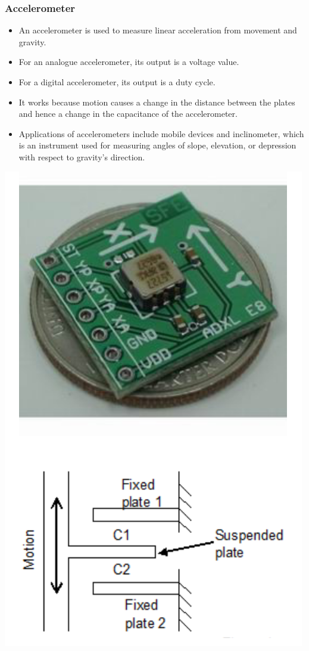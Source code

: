 \documentclass[11pt]{article}
\begin{document}
\subsubsection{Accelerometer}
\label{sec:orgb5688a1}
\begin{itemize}
\item An accelerometer is used to measure linear acceleration from movement and gravity.
\item For an analogue accelerometer, its output is a voltage value.
\item For a digital accelerometer, its output is a duty cycle.
\item It works because motion causes a change in the distance between the plates and hence a change in the capacitance of the accelerometer.
\item Applications of accelerometers include mobile devices and inclinometer, which is an instrument used for measuring angles of slope, elevation, or depression with respect to gravity's direction.
\end{itemize}

\begin{center}
\includegraphics[scale=0.9]{./images/accelerometer-diagram.png}
\end{center}
\end{document}
